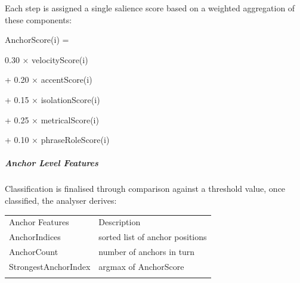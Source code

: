 Each step is assigned a single salience score based on a weighted
aggregation of these components:

AnchorScore(i) =

0.30 × velocityScore(i)

+ 0.20 × accentScore(i)

+ 0.15 × isolationScore(i)

+ 0.25 × metricalScore(i)

+ 0.10 × phraseRoleScore(i)

\subparagraph{Anchor Level Features}\label{anchor-level-features}

Classification is finalised through comparison against a threshold
value, once classified, the analyser derives:

{\def\LTcaptype{none} %
\begin{longtable}[]{@{}
  >{\raggedright\arraybackslash}p{}
  >{\raggedright\arraybackslash}p{}@{}}
\toprule\noalign{}
\begin{minipage}[b]{\linewidth}\centering
Anchor Features
\end{minipage} & \begin{minipage}[b]{\linewidth}\centering
Description
\end{minipage} \\
\begin{minipage}[b]{\linewidth}\raggedright
AnchorIndices
\end{minipage} & \begin{minipage}[b]{\linewidth}\raggedright
sorted list of anchor positions
\end{minipage} \\
\begin{minipage}[b]{\linewidth}\raggedright
AnchorCount
\end{minipage} & \begin{minipage}[b]{\linewidth}\raggedright
number of anchors in turn
\end{minipage} \\
\begin{minipage}[b]{\linewidth}\raggedright
StrongestAnchorIndex
\end{minipage} & \begin{minipage}[b]{\linewidth}\raggedright
argmax of AnchorScore
\end{minipage} \\
\begin{minipage}[b]{\linewidth}\raggedright

\end{minipage}
\end{longtable}}
